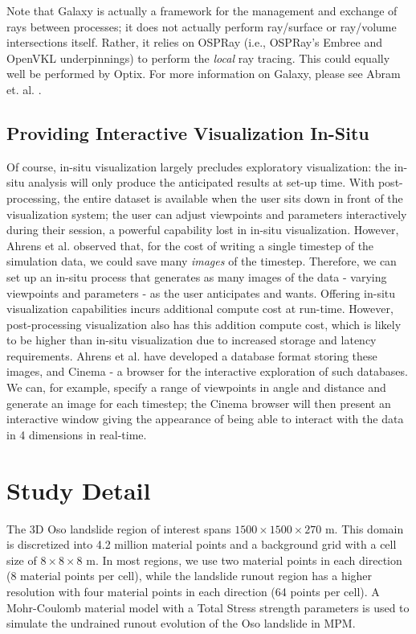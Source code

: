 \documentclass[journal]{IEEEtran}
\begin{document}
Note that Galaxy is actually a framework for the management and exchange of rays between processes; it does not actually perform ray/surface or ray/volume intersections itself.   Rather, it relies on OSPRay (i.e., OSPRay's Embree and OpenVKL underpinnings) to perform the \textit{local} ray tracing.  This could equally well be performed by Optix.   For more information on Galaxy, please see Abram et. al. \cite{abram2018galaxy}.

\subsection{Providing Interactive Visualization In-Situ}
Of course, in-situ visualization largely precludes exploratory visualization: the in-situ analysis will only produce the anticipated results at set-up time.  With post-processing, the entire dataset is available when the user sits down in front of the visualization system; the user can adjust viewpoints and parameters interactively during their session, a powerful capability lost in in-situ visualization. However, Ahrens et al. \cite{Ahrens2014cinema} observed that, for the cost of writing a single timestep of the simulation data, we could save many \textit{images} of the timestep.  Therefore, we can set up an in-situ process that generates as many images of the data - varying viewpoints and parameters - as the user anticipates and wants. Offering in-situ visualization capabilities incurs additional compute cost at run-time. However, post-processing visualization also has this addition compute cost, which is likely to be higher than in-situ visualization due to increased storage and latency requirements. Ahrens et al. have developed a database format storing these images, and Cinema - a browser for the interactive exploration of such databases.  We can, for example, specify a range of viewpoints in angle and distance and generate an image for each timestep; the Cinema browser will then present an interactive window giving the appearance of being able to interact with the data in 4 dimensions in real-time.

\section{Study Detail}
The 3D Oso landslide region of interest spans $1500 \times 1500 \times 270$ m. This domain is discretized into 4.2 million material points and a background grid with a cell size of $8 \times 8 \times 8$ m. In most regions, we use two material points in each direction (8 material points per cell), while the landslide runout region has a higher resolution with four material points in each direction (64 points per cell). A Mohr-Coulomb material model with a Total Stress strength parameters is used to simulate the undrained runout evolution of the Oso landslide in MPM. 
\end{document}
